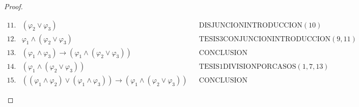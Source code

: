 \begin{proof}
\begin{enumerate}[(1)]
\[\begin{array}{llll}
            11. & (\varphi_{2} \vee \varphi_{3}) && \text{DISJUNCIONINTRODUCCION}(10) \\
            12. & \varphi_{1} \wedge (\varphi_{2} \vee \varphi_{3}) && \text{TESIS3CONJUNCIONINTRODUCCION}(9,11) \\
            13. & (\varphi_{1} \wedge \varphi_{3}) \rightarrow (\varphi_{1} \wedge (\varphi_{2} \vee \varphi_{3})) &&
              \text{CONCLUSION} \\
            14. & (\varphi_{1} \wedge (\varphi_{2} \vee \varphi_{3})) && \text{TESIS1DIVISIONPORCASOS}(1,7,13) \\
            15. & ((\varphi_{1} \wedge \varphi_{2}) \vee (\varphi_{1} \wedge \varphi_{3})) \rightarrow (\varphi_{1}
              \wedge (\varphi_{2} \vee \varphi_{3})) && \text{CONCLUSION}
          \end{array}
          \]
    \end{enumerate}
  \end{proof}

